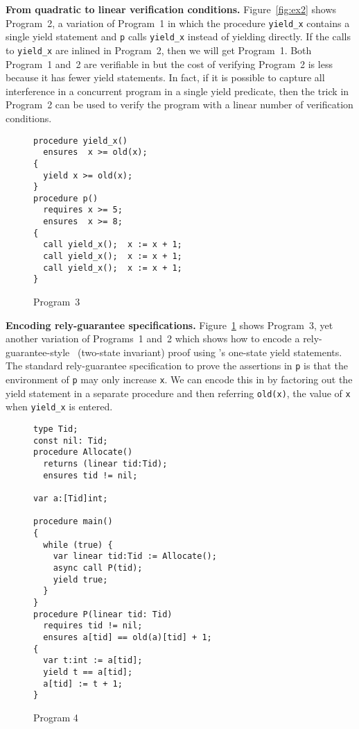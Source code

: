 {\bf From quadratic to linear verification conditions.}
Figure~\ref{fig:ex2} shows Program~2, a variation of Program~1 in which the procedure {\tt yield\_x} 
contains a single yield statement and {\tt p} calls {\tt yield\_x} instead of yielding directly.
If the calls to {\tt yield\_x} are inlined in Program~2, then we will get Program~1.
Both Program~1 and~2 are verifiable in \civl but the cost of verifying Program~2 is less because it has fewer yield statements.
In fact, if it is possible to capture all interference in a concurrent program in a single yield predicate, 
then the trick in Program~2 can be used to verify the program with a linear number of verification conditions.

\begin{figure}
\begin{verbatim}
procedure yield_x()
  ensures  x >= old(x);
{
  yield x >= old(x);
}
procedure p()
  requires x >= 5;
  ensures  x >= 8;
{
  call yield_x();  x := x + 1;
  call yield_x();  x := x + 1;
  call yield_x();  x := x + 1;
}
\end{verbatim}
\caption{Program~3}
\label{fig:ex3}
\end{figure}

{\bf Encoding rely-guarantee specifications.}
Figure~\ref{fig:ex3} shows Program~3, yet another variation of Programs~1 and~2 which shows how to encode a rely-guarantee-style~\cite{Jones83} (two-state invariant)
proof using \civl's one-state yield statements. 
The standard rely-guarantee specification to prove the assertions in {\tt p} is that the environment of {\tt p} 
may only increase {\tt x}.
We can encode this in \civl by factoring out the yield statement in a separate procedure
and then referring {\tt old(x)}, the value of {\tt x} when {\tt yield\_x} is
entered. 


\begin{figure}
\begin{verbatim}
type Tid;
const nil: Tid;
procedure Allocate() 
  returns (linear tid:Tid);
  ensures tid != nil;

var a:[Tid]int;

procedure main()
{
  while (true) {
    var linear tid:Tid := Allocate();
    async call P(tid);
    yield true;
  }
}
procedure P(linear tid: Tid)
  requires tid != nil;
  ensures a[tid] == old(a)[tid] + 1;
{
  var t:int := a[tid];
  yield t == a[tid];
  a[tid] := t + 1;
}
\end{verbatim}
\caption{Program 4}
\label{fig:ex5}
\end{figure}

